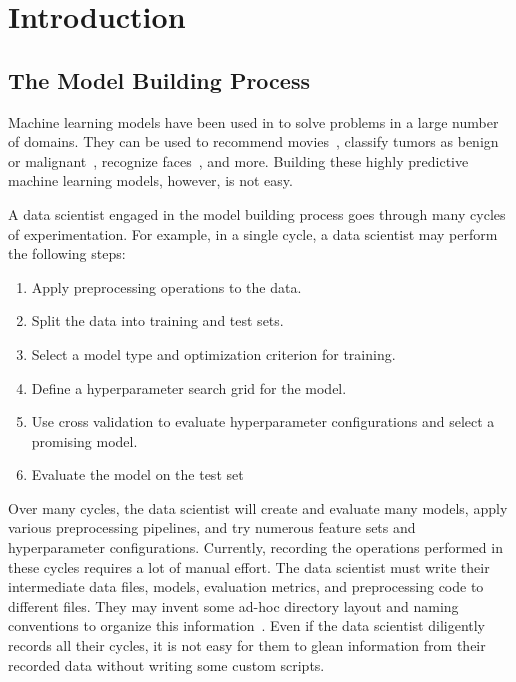 \chapter{Introduction}
\section{The Model Building Process}
Machine learning models have been used in to solve problems in a large number of
domains. They can be used to recommend movies~\cite{netflixprize}, 
classify tumors as benign or malignant~\cite{tumorprediction}, recognize faces~\cite{deepface}, and more. 
Building these highly predictive machine learning models, however, is not easy. 

A data scientist engaged in the model building process goes through many cycles of
experimentation. For example, in a single cycle, a data scientist may perform the
following steps:

\begin{enumerate}
  \item Apply preprocessing operations to the data.
  \item Split the data into training and test sets.
  \item Select a model type and optimization criterion for training.
  \item Define a hyperparameter search grid for the model.
  \item Use cross validation to evaluate hyperparameter configurations and select a 
    promising model.
  \item Evaluate the model on the test set
\end{enumerate}

Over many cycles, the data scientist will create and evaluate many models,
apply various preprocessing pipelines, and try numerous feature sets and hyperparameter
configurations. Currently, recording the operations performed in these cycles requires
a lot of manual effort. The data scientist must write their intermediate data files, models, evaluation metrics,
and preprocessing code to different files. They may invent some ad-hoc directory layout 
and naming conventions to organize this information~\cite{kaggledirectory}. Even if the data scientist
diligently records all their cycles, it is not easy for them to glean information from their
recorded data without writing some custom scripts.

